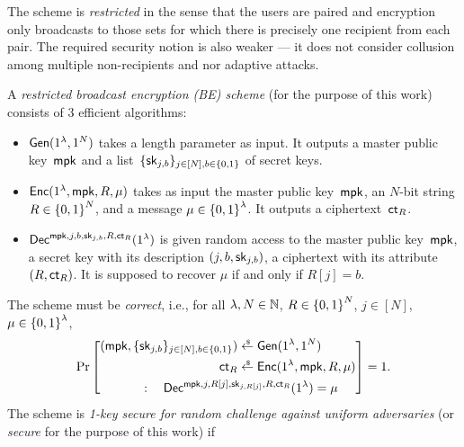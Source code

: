 The scheme is \emph{restricted} in the sense that the users are paired and encryption only broadcasts to those sets for which there is precisely one recipient from each pair.
The required security notion is also weaker --- it does not consider collusion among multiple non-recipients and nor adaptive attacks.

\begin{definition}
A \emph{restricted broadcast encryption (BE) scheme} (for the purpose of this work) consists of 3 efficient algorithms:
\begin{itemize}
\item $\Gen(1^\lambda,1^N)$ takes a length parameter as input.
It outputs a master public key~$\mpk$ and
a list~$\{\sk_{j,b}\}_{j\in[N],b\in\bit}$ of secret keys.
\item $\Enc(1^\lambda,\mpk,R,\mu)$ takes as input
the master public key~$\mpk$,
an $N$-bit string ${R\in{\{0,1\}}^N}$, and
a message ${\mu\in{\{0,1\}}^\lambda}$.
It outputs a ciphertext~$\ct_R$.
\item $\Dec^{\mpk,j,b,\sk_{j,b},R,\ct_R}(1^\lambda)$
is given random access to
the master public key~$\mpk$,
a secret key with its description $(j,b,\sk_{j,b})$,
a ciphertext with its attribute $(R,\ct_R)$.
It is supposed to recover $\mu$ if and only if ${R[j]=b}$.
\end{itemize}
The scheme must be \emph{correct}, i.e., for all
${\lambda,N\in{\mathbb{N}}}$,
${R\in{\{0,1\}}^N}$,
${j\in[N]}$,
${\mu\in{\{0,1\}}^\lambda}$,
\begin{align*}
\Pr\left[\begin{aligned}
(\mpk,\{\sk_{j,b}\}_{j\in[N],b\in\bit})
&{}
\draws\Gen(1^\lambda,1^N)
\\
\ct_R
&{}
\draws\Enc(1^\lambda,\mpk,R,\mu)
\\
:\quad
\Dec^{\mpk,j,R[j],\sk_{j,R[j]},R,\ct_R}
(1^\lambda)=\mu
\hspace*{-8em}
&
\end{aligned}
\right]
=1.
\end{align*}
The scheme is \emph{1-key secure for random challenge against uniform adversaries} (or \emph{secure} for the purpose of this work) if
\begin{align*}

\end{align*}
\end{definition}
